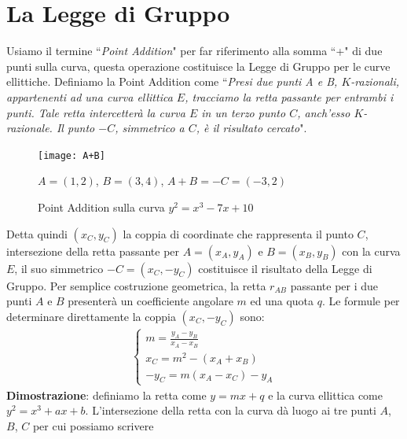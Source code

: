 \documentclass[a4paper,12pt]{tesiinfo}
\newcommand\ddfrac[2]{\frac{\displaystyle #1}{\displaystyle #2}}
\begin{document}
\section{La Legge di Gruppo}
Usiamo il termine ``\textit{Point Addition}" per far riferimento alla somma ``+" di due punti sulla curva, questa operazione costituisce la Legge di Gruppo per le curve ellittiche. Definiamo la Point Addition come ``\emph{Presi due punti A e B, $K$-razionali, appartenenti ad una curva ellittica $E$, tracciamo la retta passante per entrambi i punti. Tale retta intercetter\`a la curva $E$ in un terzo punto $C$, anch'esso $K$-razionale. Il punto $-C$, simmetrico a $C$, \`e il risultato cercato}".
%
%
%
\begin{figure}[H]
 \texttt{[image: A+B]}
 \caption{Point Addition sulla curva $y^2 = x^3-7x+10$}
\begin{center}
  $A=(1, 2)$, $ B=(3, 4)$, $ A+B=-C=(-3, 2)$
  \end{center}
 \end{figure}
Detta quindi $(x_C, y_C)$ la coppia di coordinate che rappresenta il punto $C$, intersezione della retta passante per $A=(x_A, y_A)$ e $B=(x_B, y_B)$ con la curva $E$, il suo simmetrico $-C=(x_C, -y_C)$ costituisce il risultato della Legge di Gruppo. Per semplice costruzione geometrica, la retta $r_{AB}$ passante per i due punti $A$ e $B$ presenter\`a un coefficiente angolare $m$ ed una quota $q$. Le formule per determinare direttamente la coppia $(x_C, -y_C)$ sono:
\begin{align*}
\begin{cases}
m = \ddfrac{y_A - y_B}{x_A - x_B}\\
x_C = m^2 - (x_A + x_B)\\
-y_C = m(x_A - x_C)-y_A
\end{cases}
\end{align*}
\textbf{Dimostrazione}: definiamo la retta come $y = mx+q$ e la curva ellittica come $y^2 = x^3 + ax+b$. L'intersezione della retta con la curva d\`a luogo ai tre punti $A$, $B$, $C$ per cui possiamo scrivere
\end{document}
